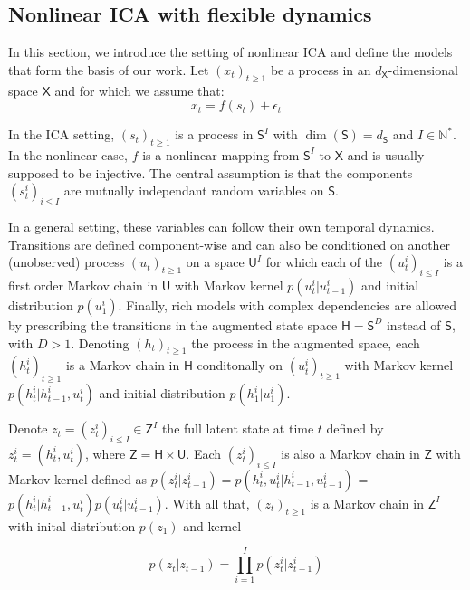 \documentclass{article}
\begin{document}
\subsection{Nonlinear ICA with flexible dynamics}\label{nonlinear_ica}

In this section, we introduce the setting of nonlinear ICA and define the models that form the basis of our work. Let $(x_t)_{t \geq 1}$ be a process in an $d_\mathsf{X}$-dimensional space $\mathsf{X}$ and for which we assume that:
$$x_t = f(s_t) + \epsilon_t$$

In the ICA setting, $(s_t)_{t \geq 1}$ is a process in $\mathsf{S}^I$ with $\dim(\mathsf{S}) = d_\mathsf{S}$ and $I \in \mathbb{N}^{*}$. In the nonlinear case, $f$ is a nonlinear mapping from $\mathsf{S}^I$ to $\mathsf{X}$ and is usually supposed to be injective. The central assumption is that the components $(s_t^i)_{i \leq I}$ are mutually independant random variables on $\mathsf{S}$.

In a general setting, these variables can follow their own temporal dynamics. Transitions are defined component-wise and can also be conditioned on another (unobserved) process $(u_t)_{t \geq 1}$ on a space $\mathsf{U}^I$ for which each of the $(u_t^i)_{i \leq I}$ is a first order Markov chain in $\mathsf{U}$ with Markov kernel $p(u_t^i|u_{t-1}^i)$ and initial distribution $p(u_1^i)$. Finally, rich models with complex dependencies are allowed by prescribing the transitions in the augmented state space $\mathsf{H} = \mathsf{S}^D$ instead of $\mathsf{S}$, with $D > 1$. Denoting $(h_t)_{t \geq 1}$ the process in the augmented space, each $(h_t^i)_{t \geq 1}$ is a Markov chain in $\mathsf{H}$ conditonally on $(u_t^i)_{t \geq 1}$ with Markov kernel $p(h_t^i|h_{t-1}^i,u_t^i)$ and initial distribution $p(h_1^i|u_1^i)$.

Denote $z_t = (z_t^i)_{i \leq I} \in \mathsf{Z}^I$ the full latent state at time $t$ defined by $z_t^i = (h_t^i, u_t^i)$, where $\mathsf{Z} = \mathsf{H} \times \mathsf{U}$. Each $(z_t^i)_{i \leq I}$ is also a Markov chain in $\mathsf{Z}$ with Markov kernel defined as $p(z_t^i|z_{t-1}^i) = p(h_t^i,u_t^i|h_{t-1}^i, u_{t-1}^i)$ = $p(h_t^i|h_{t-1}^i,u_t^i)p(u_t^i|u_{t-1}^i)$. With all that, $(z_t)_{t \geq 1}$ is a Markov chain in $\mathsf{Z}^I$ with inital distribution $p(z_1)$ and kernel

\begin{equation}\label{kernel_z}
    p(z_t|z_{t-1}) = \prod_{i=1}^I p(z_t^i|z_{t-1}^i)
\end{equation}
\end{document}
